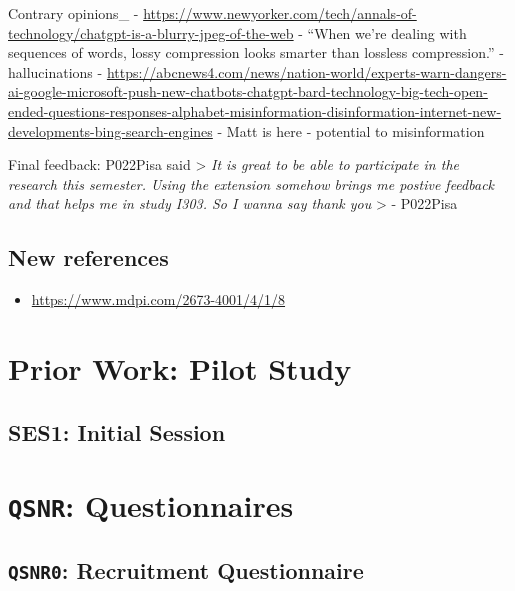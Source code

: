 \documentclass[letterpaper, nobind]{templates/ociamthesis}
\providecommand{\tightlist}{%
  \setlength{\itemsep}{0pt}\setlength{\parskip}{0pt}}
\begin{document}
Contrary opinions\_
- \url{https://www.newyorker.com/tech/annals-of-technology/chatgpt-is-a-blurry-jpeg-of-the-web}
- ``When we're dealing with sequences of words, lossy compression looks smarter than lossless compression.''
- hallucinations
- \url{https://abcnews4.com/news/nation-world/experts-warn-dangers-ai-google-microsoft-push-new-chatbots-chatgpt-bard-technology-big-tech-open-ended-questions-responses-alphabet-misinformation-disinformation-internet-new-developments-bing-search-engines}
- Matt is here
- potential to misinformation

Final feedback:
P022Pisa said
\textgreater{} \emph{It is great to be able to participate in the research this semester. Using the extension somehow brings me postive feedback and that helps me in study I303. So I wanna say thank you}
\textgreater{} - P022Pisa

\hypertarget{new-references}{%
\section{New references}\label{new-references}}

\begin{itemize}
\tightlist
\item
  \url{https://www.mdpi.com/2673-4001/4/1/8}
\end{itemize}

\startappendices

\hypertarget{app-pilot-study}{%
\chapter{Prior Work: Pilot Study}\label{app-pilot-study}}

\hypertarget{ses1-initial-session}{%
\section{SES1: Initial Session}\label{ses1-initial-session}}

\hypertarget{app-qsnr}{%
\chapter{\texorpdfstring{\texttt{QSNR}: Questionnaires}{QSNR: Questionnaires}}\label{app-qsnr}}

\hypertarget{app-qsnr0}{%
\section{\texorpdfstring{\texttt{QSNR0}: Recruitment Questionnaire}{QSNR0: Recruitment Questionnaire}}\label{app-qsnr0}}
\end{document}
